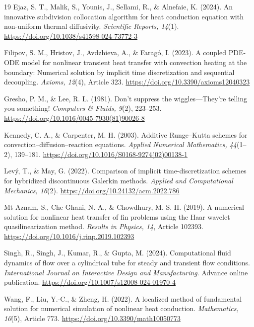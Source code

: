 \documentclass[final,5p,times,twocolumn,authoryear,11pt]{elsarticle}
\begin{document}
\begin{thebibliography}{19}
Ejaz, S. T., Malik, S., Younis, J., Sellami, R., \& Alnefaie, K. (2024). An innovative subdivision collocation algorithm for heat conduction equation with non-uniform thermal diffusivity. \textit{Scientific Reports, 14}(1). \url{https://doi.org/10.1038/s41598-024-73772-3}

Filipov, S. M., Hristov, J., Avdzhieva, A., \& Farag{\'o}, I. (2023). A coupled PDE-ODE model for nonlinear transient heat transfer with convection heating at the boundary: Numerical solution by implicit time discretization and sequential decoupling. \textit{Axioms, 12}(4), Article 323. \url{https://doi.org/10.3390/axioms12040323}

Gresho, P. M., \& Lee, R. L. (1981). Don't suppress the wiggles---They're telling you something! \textit{Computers \& Fluids, 9}(2), 223--253. \url{https://doi.org/10.1016/0045-7930(81)90026-8}

Kennedy, C. A., \& Carpenter, M. H. (2003). Additive Runge--Kutta schemes for convection--diffusion--reaction equations. \textit{Applied Numerical Mathematics, 44}(1--2), 139--181. \url{https://doi.org/10.1016/S0168-9274(02)00138-1}

Lev{\'y}, T., \& May, G. (2022). Comparison of implicit time-discretization schemes for hybridized discontinuous Galerkin methods. \textit{Applied and Computational Mechanics, 16}(2). \url{https://doi.org/10.24132/acm.2022.786}

Mt Aznam, S., Che Ghani, N. A., \& Chowdhury, M. S. H. (2019). A numerical solution for nonlinear heat transfer of fin problems using the Haar wavelet quasilinearization method. \textit{Results in Physics, 14}, Article 102393. \url{https://doi.org/10.1016/j.rinp.2019.102393}

Singh, R., Singh, J., Kumar, R., \& Gupta, M. (2024). Computational fluid dynamics of flow over a cylindrical tube for steady and transient flow conditions. \textit{International Journal on Interactive Design and Manufacturing}. Advance online publication. \url{https://doi.org/10.1007/s12008-024-01970-4}

Wang, F., Liu, Y.-C., \& Zheng, H. (2022). A localized method of fundamental solution for numerical simulation of nonlinear heat conduction. \textit{Mathematics, 10}(5), Article 773. \url{https://doi.org/10.3390/math10050773}


\end{thebibliography}
\end{document}
